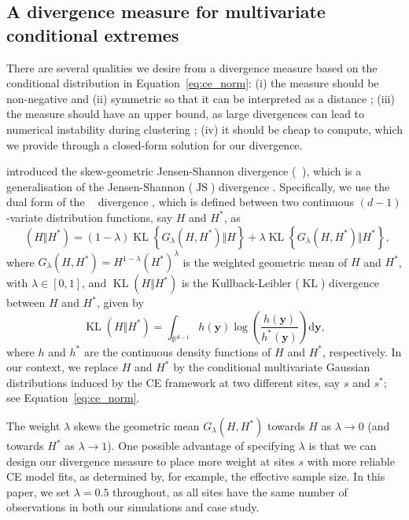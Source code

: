 \documentclass[12pt,compact]{article}
\DeclareMathOperator{\KL}{KL}
\DeclareMathOperator{\JS}{JS}
\newcommand{\JSGa}{\mathop{\mathrm{JS}^{\mathrm{G}_{\lambda}}}\nolimits}
\begin{document}
\subsection{A divergence measure for multivariate conditional extremes}
\label{subsec:div}

There are several qualities we desire from a divergence measure based on the conditional distribution in Equation~\eqref{eq:ce_norm}:
(i) the measure should be non-negative and (ii) symmetric so that it can be interpreted as a distance \citep{Vijendra2015};
(iii) the measure should have an upper bound, as large divergences can lead to numerical instability during clustering \citep{Thiagarajan2025};
(iv) it should be cheap to compute, which we provide through a closed-form solution for our divergence. 

\citet{Nielsen2019} introduced the skew-geometric Jensen-Shannon divergence ($\JSGa{}$), which is a generalisation of the Jensen-Shannon ($\JS{}$) divergence \citep{Lin1991}. 
Specifically, we use the dual form of the $\JSGa{}$ divergence \citep{Deasy2020}, which is defined between two continuous $(d-1)$-variate distribution functions, say $H$ and $H^*$, as
\begin{equation}\label{eq:jsga}
  \JSGa{(H \Vert H^*)} = (1- \lambda) \KL{\left\{G_{\lambda}(H, H^*) \Vert H\right\}} + \lambda \KL{\left\{G_{\lambda}(H, H^*) \Vert H^*\right\}},
\end{equation}
where $G_{\lambda}(H, H^*) = H^{1-\lambda} {(H^*)}^{\lambda}$ is the weighted geometric mean of $H$ and $H^*$, with $\lambda \in [0, 1]$, and $\KL{(H \Vert H^*)}$ is the Kullback-Leibler ($\KL{}$) divergence between $H$ and $H^*$, given by 
\begin{equation}\label{eq:kl}
  \KL{(H \Vert H^*)} = \int_{\mathbb{R}^{d-1}} h(\symbf{y}) \log\left(\frac{h(\symbf{y})}{h^*(\symbf{y})}\right) \mathrm{d}\symbf{y},
\end{equation}
where $h$ and $h^*$ are the continuous density functions of $H$ and $H^*$, respectively. 
In our context, we replace $H$ and $H^*$ by the conditional multivariate Gaussian distributions induced by the CE framework at two different sites, say $s$ and $s^*$; see Equation~\eqref{eq:ce_norm}.

The weight $\lambda$ skews the geometric mean $G_{\lambda}(H,H^*)$ towards $H$ as $\lambda \to 0$ (and towards $H^*$ as $\lambda \to 1$).
One possible advantage of specifying $\lambda$ is that we can design our divergence measure to place more weight at sites $s$ with more reliable CE model fits, as determined by, for example, the effective sample size.
In this paper, we set $\lambda = 0.5$ throughout, as all sites have the same number of observations in both our simulations and case study.
\end{document}
